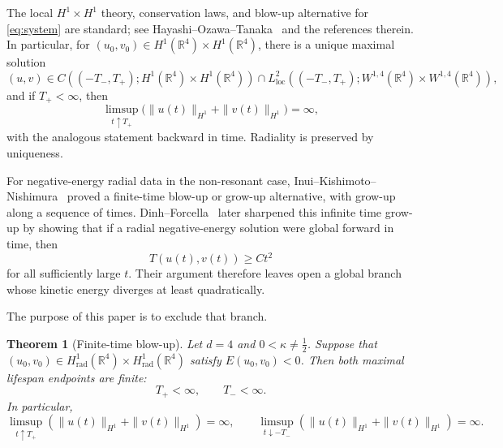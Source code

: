 \documentclass[10pt,a4paper]{amsart}
\numberwithin{equation}{section}
\newtheorem{theorem}{Theorem}[section]
\newcommand{\R}{\mathbb{R}}
\begin{document}
The local $H^1\times H^1$ theory, conservation laws, and blow-up alternative for \eqref{eq:system} are standard; see Hayashi--Ozawa--Tanaka~\cite{HOT} and the references therein.  In particular, for $(u_0,v_0)\in H^1(\R^4) \times H^1(\R^4)$, there is a unique maximal solution
\[
 (u,v)\in C((-T_-,T_+);H^1(\R^4)\times H^1(\R^4)) \cap L^2_{\textrm{loc}}((-T_-,T_+); W^{1,4}(\R^4)\times W^{1,4}(\R^4)),
\]
and if $T_+<\infty$, then
\begin{equation}\label{eq:blowup-alternative}
\limsup_{t\uparrow T_+}\big(\|u(t)\|_{H^1}+\|v(t)\|_{H^1}\big)=\infty,
\end{equation}
with the analogous statement backward in time. Radiality is preserved by uniqueness.

For negative-energy radial data in the non-resonant case, Inui--Kishimoto--Nishimura~\cite{IKN} proved a finite-time blow-up or grow-up alternative, with grow-up along a sequence of times. Dinh--Forcella~\cite{DF} later sharpened this infinite time grow-up by showing that if a radial negative-energy solution were global forward in time, then
\begin{equation}\label{eq:DF-growup}
 T(u(t),v(t))\ge Ct^2
\end{equation}
for all sufficiently large $t$. Their argument therefore leaves open a global branch whose kinetic energy diverges at least quadratically.

The purpose of this paper is to exclude that branch.


\begin{theorem}[Finite-time blow-up]\label{thm:main}
Let $d=4$ and $0<\kappa\neq\frac12$.  Suppose that $(u_0,v_0)\in H^1_{\mathrm{rad}}(\R^4)\times H^1_{\mathrm{rad}}(\R^4)$ satisfy $E(u_0,v_0)<0$. Then both maximal lifespan endpoints are finite:
\[
 T_+<\infty,\qquad T_-<\infty.
\]
In particular,
\[
\limsup_{t\uparrow T_+} (\|u(t)\|_{H^1} + \|v(t)\|_{H^1}) = \infty, \qquad \limsup_{t\downarrow -T_-}(\|u(t)\|_{H^1}+\|v(t)\|_{H^1})=\infty.
\]
\end{theorem}
\end{document}
